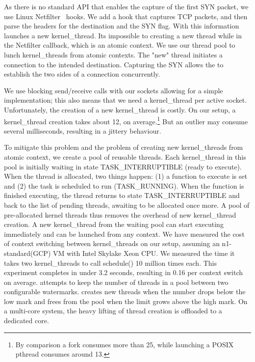 As there is no standard API that enables the capture of the first SYN packet, we use Linux Netfilter~\cite{netfilter} hooks. We add a hook that captures TCP packets, and then parse the headers for the destination and the SYN flag. With this information \oursys launches a new kernel\_thread. Its impossible to creating a new thread while in the Netfilter callback, which is an atomic context. We use our thread pool to lunch kernel\_threads from atomic contexts. The "new" thread initiates a connection to the intended destination. Capturing the SYN allows the \relay to establish the two sides of a connection concurrently.

 We use blocking send/receive calls with our sockets allowing for a simple implementation; this also means that we need a kernel\_thread per active socket. Unfortunately, the creation of a new kernel\_thread is costly. On our setup, a kernel\_thread creation takes about 12\usec, on average.\footnote{By comparison a fork consumes more than 25\usec , while launching a POSIX pthread consumes around 13\usec.} But an outlier may consume several milliseconds, resulting in a jittery behaviour.

To mitigate this problem and the problem of creating new kernel\_threads from atomic context, we create a pool of reusable threads. Each kernel\_thread in this pool is initially waiting in state TASK\_INTERRUPTIBLE (ready to execute). When the thread is allocated, two things happen: (1) a function to execute is set and (2)  the task is scheduled to run (TASK\_RUNNING). When the function is finished executing, the thread returns to state TASK\_INTERRUPTIBLE and back to the list of pending threads, awaiting to be allocated once more. A pool of pre-allocated kernel threads thus removes the overhead of new kernel\_thread creation. A new kernel\_thread from the waiting pool can start executing immediately and can be launched from any context. We have measured the cost of context switching between kernel\_threads on our setup, assuming an n1-standard(GCP) VM with Intel Skylake Xeon CPU. We measured the time it takes two kernel\_threads to call schedule() 10 million times each. This experiment completes in under 3.2 seconds, resulting in 0.16 \usec per context switch on average. \oursys attempts to keep the number of threads in a pool between two configurable watermarks. \oursys creates new threads when the number drops below the low mark and frees from the pool when the limit grows above the high mark. On a multi-core system, the heavy lifting of thread creation is offloaded to a dedicated core.

